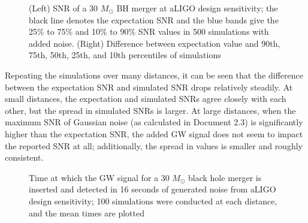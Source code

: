 \documentclass{article}
\begin{document}
\begin{figure}[!htb]
    \caption{\label{fig:distance} (Left) SNR of a 30 $M_\odot$ BH merger at aLIGO design sensitivity; the black line denotes the expectation SNR and the blue bands give the 25\% to 75\% and 10\% to 90\% SNR values in 500 simulations with added noise. (Right) Difference between expectation value and 90th, 75th, 50th, 25th, and 10th percentiles of simulations}
\end{figure}

Repeating the simulations over many distances, it can be seen that the difference between the expectation SNR and simulated SNR drops relatively steadily. At small distances, the expectation and simulated SNRs agree closely with each other, but the spread in simulated SNRs is larger. At large distances, when the maximum SNR of Gaussian noise (as calculated in Document 2.3) is significantly higher than the expectation SNR, the added GW signal does not seem to impact the reported SNR at all; additionally, the spread in values is smaller and roughly consistent.     

\begin{figure}[!htb]
    \caption{\label{fig:time} Time at which the GW signal for a 30 $M_\odot$ black hole merger is inserted and detected in 16 seconds of generated noise from aLIGO design sensitivity; 100 simulations were conducted at each distance, and the mean times are plotted}
\end{figure}
\end{document}
